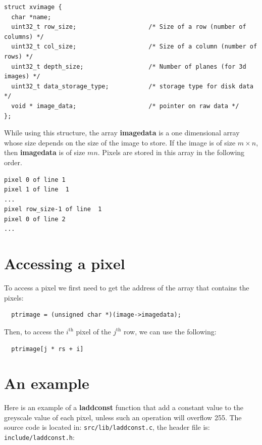 \documentclass{article}
\begin{document}
\begin{verbatim}
struct xvimage {
  char *name;
  uint32_t row_size;                    /* Size of a row (number of columns) */
  uint32_t col_size;                    /* Size of a column (number of rows) */
  uint32_t depth_size;                  /* Number of planes (for 3d images) */
  uint32_t data_storage_type;           /* storage type for disk data */
  void * image_data;                    /* pointer on raw data */
};
\end{verbatim}

While using this structure, the array {\bf imagedata} is a one
dimensional array whose size depends on the size of the image to
store. If the image is of size $m\times n$, then {\bf imagedata} is of
size $mn$. Pixels are stored in this array in the following order.

\begin{verbatim}
pixel 0 of line 1
pixel 1 of line  1
...
pixel row_size-1 of line  1
pixel 0 of line 2
...
\end{verbatim}

\section{Accessing a pixel}


To access a pixel we first need to get the address of the array that
contains the pixels:
\begin{verbatim}
  ptrimage = (unsigned char *)(image->imagedata);
\end{verbatim}

Then, to access the $i^{\mbox{th}}$ pixel of the $j^{\mbox{th}}$ row,
we can use the following:

\begin{verbatim}
  ptrimage[j * rs + i]
\end{verbatim}

\section{An example}

Here is an example of a {\bf laddconst} function that add a constant
value to the greyscale value of each pixel, unless such an operation
will overflow 255. The source code is located in:
\verb|src/lib/laddconst.c|, the header file is:
\verb|include/laddconst.h|:
\end{document}
